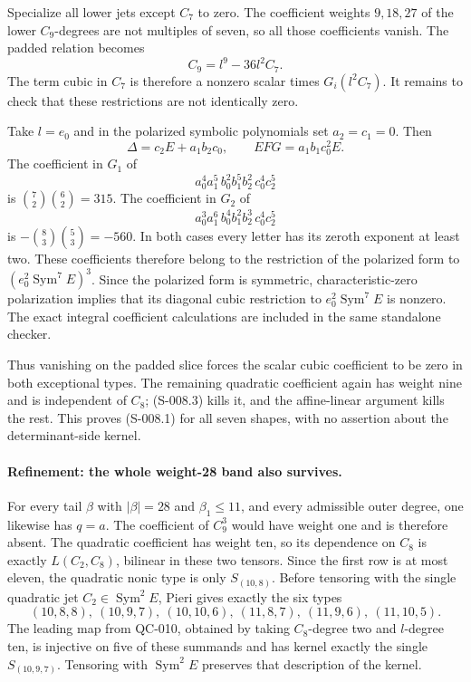 Specialize all lower jets except $C_7$ to zero.  The coefficient
weights $9,18,27$ of the lower $C_9$-degrees are not multiples of
seven, so all those coefficients vanish.  The padded relation becomes
\[
                              C_9=l^9-36l^2C_7.
\]
The term cubic in $C_7$ is therefore a nonzero scalar times
$G_i(l^2C_7)$.  It remains to check that these restrictions are not
identically zero.

Take $l=e_0$ and in the polarized symbolic polynomials set
$a_2=c_1=0$.  Then
\[
       \Delta=c_2E+a_1b_2c_0,\qquad EFG=a_1b_1c_0^2E.
\]
The coefficient in $G_1$ of
\[
       a_0^4a_1^5\,b_0^2b_1^5b_2^2\,c_0^4c_2^5
\]
is $\binom72\binom62=315$.  The coefficient in $G_2$ of
\[
       a_0^3a_1^6\,b_0^4b_1^2b_2^3\,c_0^4c_2^5
\]
is $-\binom83\binom53=-560$.  In both cases every letter has
its zeroth exponent at least two.  These coefficients therefore
belong to the restriction of the polarized form to
$(e_0^2\operatorname{Sym}^7E)^3$.  Since the polarized form is
symmetric, characteristic-zero polarization implies that its
diagonal cubic restriction to $e_0^2\operatorname{Sym}^7E$ is
nonzero.  The exact integral coefficient calculations are included
in the same standalone checker.

Thus vanishing on the padded slice forces the scalar cubic
coefficient to be zero in both exceptional types.  The remaining
quadratic coefficient again has weight nine and is independent of
$C_8$; (S-008.3) kills it, and the affine-linear argument kills the
rest.  This proves (S-008.1) for all seven shapes, with no assertion
about the determinant-side kernel.

\paragraph{Refinement: the whole weight-28 band also survives.}
For every tail $\beta$ with $|\beta|=28$ and $\beta_1\leq11$,
and every admissible outer degree, one likewise has $q=a$.
The coefficient of $C_9^3$ would have weight one and is therefore
absent.  The quadratic coefficient has weight ten, so its dependence
on $C_8$ is exactly $L(C_2,C_8)$, bilinear in these two tensors.
Since the first row is at most eleven, the quadratic nonic type is
only $S_{(10,8)}$.  Before tensoring with the single quadratic jet
$C_2\in\operatorname{Sym}^2E$, Pieri gives exactly the six types
\[
 (10,8,8),\ (10,9,7),\ (10,10,6),\
 (11,8,7),\ (11,9,6),\ (11,10,5).
\]
The leading map from QC-010, obtained by taking $C_8$-degree two
and $l$-degree ten, is injective on five of these summands and
has kernel exactly the single $S_{(10,9,7)}$.  Tensoring with
$\operatorname{Sym}^2E$ preserves that description of the kernel.

